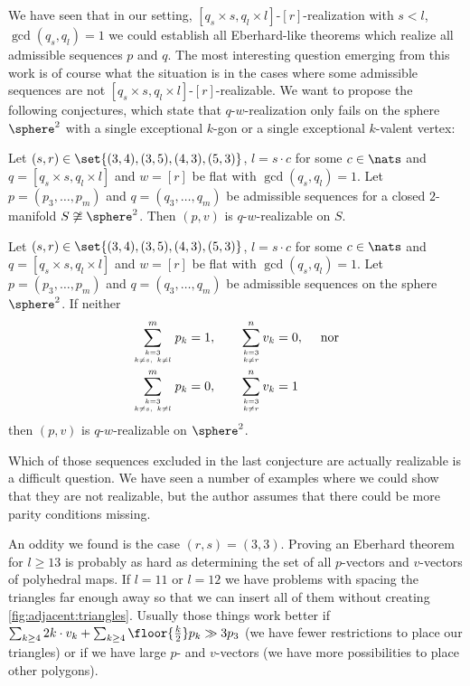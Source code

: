 \label{sec:closing:remarks}

We have seen that in our setting, $[q_s \times s, q_l \times l]$-$[r]$-realization with $s < l$, $\gcd(q_s, q_l) = 1$ we could establish all {\sc Eberhard}-like theorems which realize all admissible sequences $p$ and $q$. The most interesting question emerging from this work is of course what the situation is in the cases where some admissible sequences are not $[q_s \times s, q_l \times l]$-$[r]$-realizable. 
\clearpage
We want to propose the following conjectures, which state that $q$-$w$-realization only fails on the sphere $\sphere^2$ with a single exceptional $k$-gon or a single exceptional $k$-valent vertex:

\begin{conjecture}
  Let $(s, r) \in \set{(3, 4), (3, 5), (4, 3), (5, 3)}$, $l = s \cdot c$ for some $c \in \nats$ and \linebreak $q = [q_s \times s, q_l \times l]$ and $w = [r]$ be flat with $\gcd(q_s, q_l) = 1$. Let $p = (p_3, \dots, p_m)$ and $q = (q_3, \dots, q_m)$ be admissible sequences for a closed $2$-manifold $S \not\cong \sphere^2$. Then $(p, v)$ is $q$-$w$-realizable on $S$.
\end{conjecture}

\begin{conjecture}
  Let $(s, r) \in \set{(3, 4), (3, 5), (4, 3), (5, 3)}$, $l = s \cdot c$ for some $c \in \nats$ and \linebreak $q = [q_s \times s, q_l \times l]$ and $w = [r]$ be flat with $\gcd(q_s, q_l) = 1$. Let $p = (p_3, \dots, p_m)$ and $q = (q_3, \dots, q_m)$ be admissible sequences on the sphere $\sphere^2$. If neither
  \begin{align*}
    \sum_{k = 3 \atop k \neq s, ~k \neq l}^m p_k = 1, \qquad&\sum_{k = 3 \atop k \neq r}^n v_k = 0, \quad \text{~nor} \\
    \sum_{k = 3 \atop k \neq s, ~k \neq l}^m p_k = 0, \qquad&\sum_{k = 3 \atop k \neq r}^n v_k = 1
  \end{align*}
then $(p, v)$ is $q$-$w$-realizable on $\sphere^2$.
\end{conjecture}

Which of those sequences excluded in the last conjecture are actually realizable is a difficult question. We have seen a number of examples where we could show that they are not realizable, but the author assumes that there could be more parity conditions missing.

An oddity we found is the case $(r, s) = (3, 3)$. Proving an {\sc Eberhard} theorem for $l \geq 13$ is probably as hard as determining the set of all $p$-vectors and $v$-vectors of polyhedral maps. If $l = 11$ or $l = 12$ we have problems with spacing the triangles far enough away so that we can insert all of them without creating \autoref{fig:adjacent:triangles}. Usually those things work better if $\sum_{k \geq 4} 2k \cdot v_k + \sum_{k \geq 4} \floor{\tfrac{k}{2}} p_k \gg 3p_3$ (we have fewer restrictions to place our triangles) or if we have large $p$- and $v$-vectors (we have more possibilities to place other polygons).

